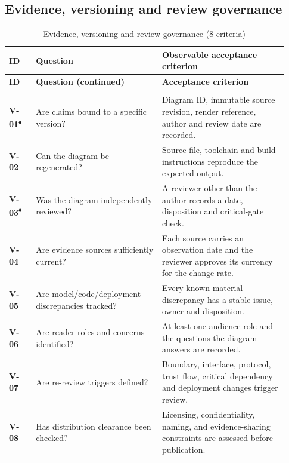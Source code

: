 \documentclass[10pt,letterpaper]{article}
\newcommand{\Gate}{\textsuperscript{\(\blacklozenge\)}}
\newcommand{\CheckRow}[3]{\textbf{\textsf{#1}} & #2 & #3\\[3pt]}
\newcommand{\ChecklistHeader}{\toprule
\textbf{ID} & \textbf{Question} & \textbf{Observable acceptance criterion}\\\midrule
\endfirsthead
\toprule\textbf{ID} & \textbf{Question (continued)} & \textbf{Acceptance criterion}\\\midrule
\endhead
\midrule\multicolumn{3}{r}{\footnotesize Continued on next page}\\\endfoot
\bottomrule\endlastfoot}
\begin{document}
\subsection{Evidence, versioning and review governance}
\begin{longtable}{@{}>{\raggedright\arraybackslash}p{0.09\linewidth}>{\raggedright\arraybackslash}p{0.42\linewidth}>{\raggedright\arraybackslash}p{0.42\linewidth}@{}}
\caption{Evidence, versioning and review governance (8 criteria)}\label{tab:review-V}\\
\ChecklistHeader
\CheckRow{V-01\Gate}{Are claims bound to a specific version?}{Diagram ID, immutable source revision, render reference, author and review date are recorded.}
\CheckRow{V-02}{Can the diagram be regenerated?}{Source file, toolchain and build instructions reproduce the expected output.}
\CheckRow{V-03\Gate}{Was the diagram independently reviewed?}{A reviewer other than the author records a date, disposition and critical-gate check.}
\CheckRow{V-04}{Are evidence sources sufficiently current?}{Each source carries an observation date and the reviewer approves its currency for the change rate.}
\CheckRow{V-05}{Are model/code/deployment discrepancies tracked?}{Every known material discrepancy has a stable issue, owner and disposition.}
\CheckRow{V-06}{Are reader roles and concerns identified?}{At least one audience role and the questions the diagram answers are recorded.}
\CheckRow{V-07}{Are re-review triggers defined?}{Boundary, interface, protocol, trust flow, critical dependency and deployment changes trigger review.}
\CheckRow{V-08}{Has distribution clearance been checked?}{Licensing, confidentiality, naming, and evidence-sharing constraints are assessed before publication.}
\end{longtable}
\end{document}
